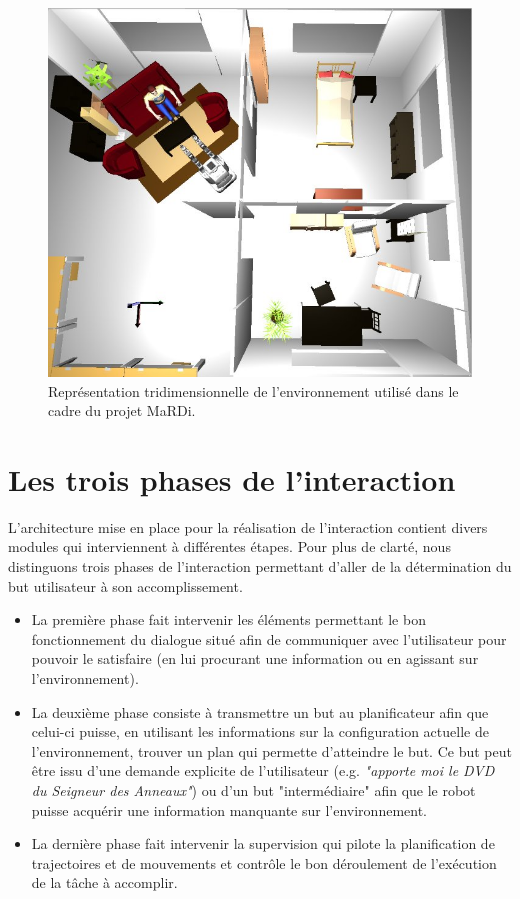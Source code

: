 \documentclass[a4paper,11pt,twoside]{StyleThese}
\begin{document}
\begin{figure}[ht!]
 \centering
  \includegraphics[width=0.89\linewidth]{./img/mardiSetup.jpg} 
  \caption {Représentation tridimensionnelle de l'environnement utilisé dans le cadre du projet MaRDi.}
  \label{fig:env}
\end{figure}





\section{Les trois phases de l'interaction}
\label{sec:troisPhases}



L'architecture mise en place pour la réalisation de l'interaction contient divers modules qui interviennent à différentes étapes.
Pour plus de clarté, nous distinguons trois phases de l'interaction permettant d'aller de la détermination du but utilisateur à son accomplissement. 

\begin{itemize}
\item La première phase fait intervenir les éléments permettant le bon fonctionnement du dialogue situé afin de communiquer avec l'utilisateur pour pouvoir le satisfaire (en lui procurant une information ou en agissant sur l'environnement).
\item La deuxième phase consiste à transmettre un but au planificateur afin que celui-ci puisse, en utilisant les informations sur la configuration actuelle de l'environnement, trouver un plan qui permette d'atteindre le but. Ce but peut être issu d'une demande explicite de l'utilisateur (e.g. \textit{"apporte moi le DVD du Seigneur des Anneaux"}) ou d'un but "intermédiaire" afin que le robot puisse acquérir une information manquante sur l'environnement.
\item La dernière phase fait intervenir la supervision qui pilote la planification de trajectoires et de mouvements et contrôle le bon déroulement de l'exécution de la tâche à accomplir.
\end{itemize}
\end{document}
